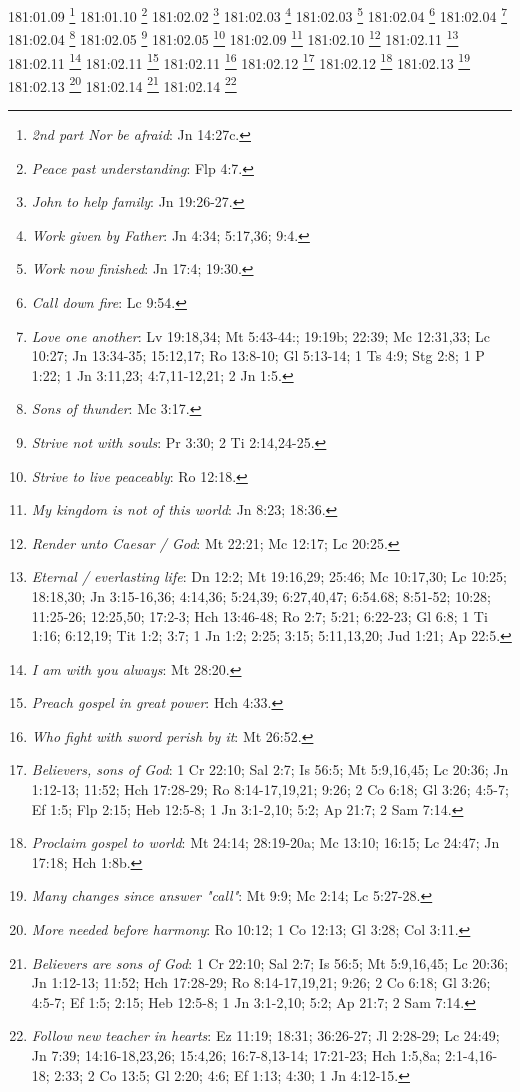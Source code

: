 181:01.09 \footnote{\textit{2nd part Nor be afraid}: Jn 14:27c.}
181:01.10 \footnote{\textit{Peace past understanding}: Flp 4:7.}
181:02.02 \footnote{\textit{John to help family}: Jn 19:26-27.}
181:02.03 \footnote{\textit{Work given by Father}: Jn 4:34; 5:17,36; 9:4.}
181:02.03 \footnote{\textit{Work now finished}: Jn 17:4; 19:30.}
181:02.04 \footnote{\textit{Call down fire}: Lc 9:54.}
181:02.04 \footnote{\textit{Love one another}: Lv 19:18,34; Mt 5:43-44:; 19:19b; 22:39; Mc 12:31,33; Lc 10:27; Jn 13:34-35; 15:12,17; Ro 13:8-10; Gl 5:13-14; 1 Ts 4:9; Stg 2:8; 1 P 1:22; 1 Jn 3:11,23; 4:7,11-12,21; 2 Jn 1:5.}
181:02.04 \footnote{\textit{Sons of thunder}: Mc 3:17.}
181:02.05 \footnote{\textit{Strive not with souls}: Pr 3:30; 2 Ti 2:14,24-25.}
181:02.05 \footnote{\textit{Strive to live peaceably}: Ro 12:18.}
181:02.09 \footnote{\textit{My kingdom is not of this world}: Jn 8:23; 18:36.}
181:02.10 \footnote{\textit{Render unto Caesar / God}: Mt 22:21; Mc 12:17; Lc 20:25.}
181:02.11 \footnote{\textit{Eternal / everlasting life}: Dn 12:2; Mt 19:16,29; 25:46; Mc 10:17,30; Lc 10:25; 18:18,30; Jn 3:15-16,36; 4:14,36; 5:24,39; 6:27,40,47; 6:54.68; 8:51-52; 10:28; 11:25-26; 12:25,50; 17:2-3; Hch 13:46-48; Ro 2:7; 5:21; 6:22-23; Gl 6:8; 1 Ti 1:16; 6:12,19; Tit 1:2; 3:7; 1 Jn 1:2; 2:25; 3:15; 5:11,13,20; Jud 1:21; Ap 22:5.}
181:02.11 \footnote{\textit{I am with you always}: Mt 28:20.}
181:02.11 \footnote{\textit{Preach gospel in great power}: Hch 4:33.}
181:02.11 \footnote{\textit{Who fight with sword perish by it}: Mt 26:52.}
181:02.12 \footnote{\textit{Believers, sons of God}: 1 Cr 22:10; Sal 2:7; Is 56:5; Mt 5:9,16,45; Lc 20:36; Jn 1:12-13; 11:52; Hch 17:28-29; Ro 8:14-17,19,21; 9:26; 2 Co 6:18; Gl 3:26; 4:5-7; Ef 1:5; Flp 2:15; Heb 12:5-8; 1 Jn 3:1-2,10; 5:2; Ap 21:7; 2 Sam 7:14.}
181:02.12 \footnote{\textit{Proclaim gospel to world}: Mt 24:14; 28:19-20a; Mc 13:10; 16:15; Lc 24:47; Jn 17:18; Hch 1:8b.}
181:02.13 \footnote{\textit{Many changes since answer "call"}: Mt 9:9; Mc 2:14; Lc 5:27-28.}
181:02.13 \footnote{\textit{More needed before harmony}: Ro 10:12; 1 Co 12:13; Gl 3:28; Col 3:11.}
181:02.14 \footnote{\textit{Believers are sons of God}: 1 Cr 22:10; Sal 2:7; Is 56:5; Mt 5:9,16,45; Lc 20:36; Jn 1:12-13; 11:52; Hch 17:28-29; Ro 8:14-17,19,21; 9:26; 2 Co 6:18; Gl 3:26; 4:5-7; Ef 1:5; 2:15; Heb 12:5-8; 1 Jn 3:1-2,10; 5:2; Ap 21:7; 2 Sam 7:14.}
181:02.14 \footnote{\textit{Follow new teacher in hearts}: Ez 11:19; 18:31; 36:26-27; Jl 2:28-29; Lc 24:49; Jn 7:39; 14:16-18,23,26; 15:4,26; 16:7-8,13-14; 17:21-23; Hch 1:5,8a; 2:1-4,16-18; 2:33; 2 Co 13:5; Gl 2:20; 4:6; Ef 1:13; 4:30; 1 Jn 4:12-15.}
